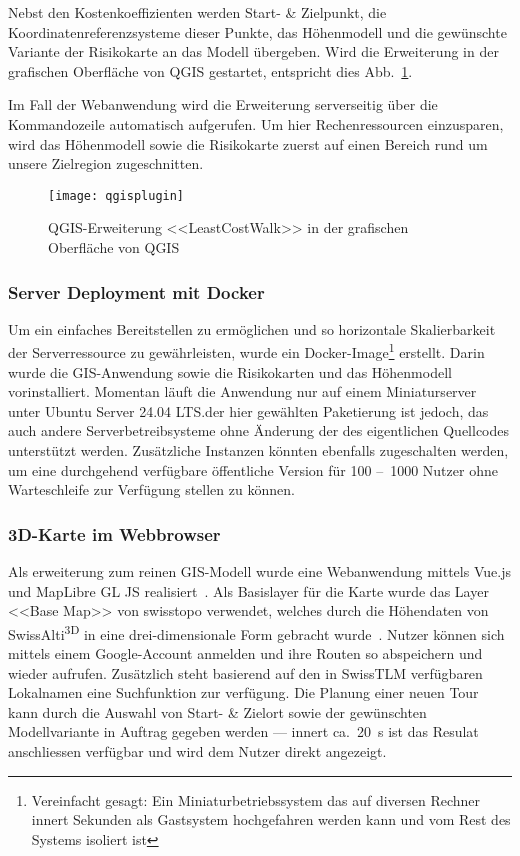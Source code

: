 \begin{multicols}{2}
Nebst den Kostenkoeffizienten werden Start- \& Zielpunkt, die Koordinatenreferenzsysteme dieser Punkte, das Höhenmodell und die gewünschte Variante der Risikokarte an das Modell übergeben. Wird die Erweiterung in der grafischen Oberfläche von QGIS gestartet, entspricht dies Abb.\ \ref{fig:qgisplugin}. 

Im Fall der Webanwendung wird die Erweiterung serverseitig über die Kommandozeile automatisch aufgerufen. Um hier Rechenressourcen einzusparen, wird das Höhenmodell sowie die Risikokarte zuerst auf einen Bereich rund um unsere Zielregion zugeschnitten.

\begin{figure}[H]
  \centering
  \texttt{[image: qgisplugin]}
  \caption{QGIS-Erweiterung <<LeastCostWalk>> in der grafischen Oberfläche von QGIS}\label{fig:qgisplugin}
\end{figure}

\subsubsection{Server Deployment mit Docker}

Um ein einfaches Bereitstellen zu ermöglichen und so horizontale Skalierbarkeit der Serverressource zu gewährleisten, wurde ein Docker-Image\footnote{Vereinfacht gesagt: Ein Miniaturbetriebssystem das auf diversen Rechner innert Sekunden als Gastsystem hochgefahren werden kann und vom Rest des Systems isoliert ist} erstellt. Darin wurde die GIS-Anwendung sowie die Risikokarten und das Höhenmodell vorinstalliert. Momentan läuft die Anwendung nur auf einem Miniaturserver unter Ubuntu Server 24.04 LTS.\@Vorteil der hier gewählten Paketierung ist jedoch, das auch andere Serverbetreibsysteme ohne Änderung der des eigentlichen Quellcodes unterstützt werden. Zusätzliche Instanzen könnten ebenfalls zugeschalten werden, um eine durchgehend verfügbare öffentliche Version für 100 --~1000 Nutzer ohne Warteschleife zur Verfügung stellen zu können.

\subsubsection{3D-Karte im Webbrowser}

Als erweiterung zum reinen GIS-Modell wurde eine Webanwendung mittels Vue.js und MapLibre GL JS realisiert~\cite{vuedevman}\cite{maplibregljs}. Als Basislayer für die Karte wurde das Layer <<Base Map>> von swisstopo verwendet, welches durch die Höhendaten von SwissAlti\textsuperscript{3D} in eine drei-dimensionale Form gebracht wurde~\cite{basevtprod}\cite{alti3dprod}. Nutzer können sich mittels einem Google-Account anmelden und ihre Routen so abspeichern und wieder aufrufen. Zusätzlich steht basierend auf den in SwissTLM verfügbaren Lokalnamen eine Suchfunktion zur verfügung. Die Planung einer neuen Tour kann durch die Auswahl von Start- \& Zielort sowie der gewünschten Modellvariante in Auftrag gegeben werden --- innert ca.\ \qty{20}{s} ist das Resulat anschliessen verfügbar und wird dem Nutzer direkt angezeigt.

\end{multicols}

